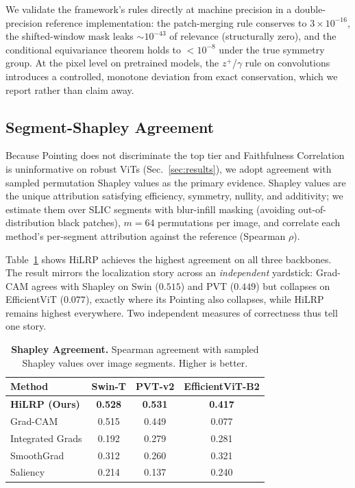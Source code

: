\documentclass[lettersize,journal]{IEEEtran}
\begin{document}
We validate the framework's rules directly at machine precision in a double-precision reference implementation: the patch-merging rule conserves to $3\times10^{-16}$, the shifted-window mask leaks $\sim10^{-43}$ of relevance (structurally zero), and the conditional equivariance theorem holds to $<10^{-8}$ under the true symmetry group. At the pixel level on pretrained models, the $z^+$/$\gamma$ rule on convolutions introduces a controlled, monotone deviation from exact conservation, which we report rather than claim away.

\subsection{Segment-Shapley Agreement}
\label{sec:shapley}
Because Pointing does not discriminate the top tier and Faithfulness Correlation is uninformative on robust ViTs (Sec.~\ref{sec:results}), we adopt agreement with sampled permutation Shapley values as the primary evidence. Shapley values are the unique attribution satisfying efficiency, symmetry, nullity, and additivity; we estimate them over SLIC segments with blur-infill masking (avoiding out-of-distribution black patches), $m{=}64$ permutations per image, and correlate each method's per-segment attribution against the reference (Spearman $\rho$).

Table~\ref{tab:shapley} shows HiLRP achieves the highest agreement on all three backbones. The result mirrors the localization story across an \emph{independent} yardstick: Grad-CAM agrees with Shapley on Swin ($0.515$) and PVT ($0.449$) but collapses on EfficientViT ($0.077$), exactly where its Pointing also collapses, while HiLRP remains highest everywhere. Two independent measures of correctness thus tell one story.

\begin{table}[h]
  \centering
  \caption{\textbf{Shapley Agreement.} Spearman agreement with sampled Shapley values over image segments. Higher is better.}
  \label{tab:shapley}
  \setlength{\tabcolsep}{5pt}
  \begin{tabular}{l c c c}
    \toprule
    Method & Swin-T & PVT-v2 & EfficientViT-B2 \\
    \midrule
    \textbf{HiLRP (Ours)} & \textbf{0.528} & \textbf{0.531} & \textbf{0.417} \\
    Grad-CAM & 0.515 & 0.449 & 0.077 \\
    Integrated Grads & 0.192 & 0.279 & 0.281 \\
    SmoothGrad & 0.312 & 0.260 & 0.321 \\
    Saliency & 0.214 & 0.137 & 0.240 \\
    \bottomrule
  \end{tabular}
\end{table}
\end{document}
